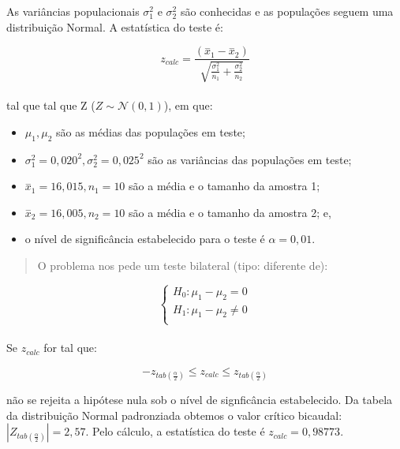 \documentclass[
]{book}
\providecommand{\tightlist}{%
  \setlength{\itemsep}{0pt}\setlength{\parskip}{0pt}}
\begin{document}
\hfill\break

As variâncias populacionais \(\sigma_{1}^{2}\) e \(\sigma_{2}^{2}\) são conhecidas e as populações seguem uma distribuição Normal. A estatística do teste é:

\hfill\break

\[
z_{calc} =   \frac{(\stackrel{-}{x}_{1} - \stackrel{-}{x}_{2}) }{\sqrt{\frac{\sigma^{2}_{1}}{n_{1}}+\frac{\sigma^{2}_{2}}{n_{2}}}}
\]\\

tal que tal que Z (\(Z \sim \mathcal{N}(0,1)\)), em que:

\hfill\break

\begin{itemize}
\tightlist
\item
  \(\mu_{1} , \mu_{2}\) são as médias das populações em teste;\\
\item
  \(\sigma_{1}^{2}=0,020^{2}, \sigma_{2}^{2}=0,025^{2}\) são as variâncias das populações em teste;\\
\item
  \(\stackrel{-}{x}_{1}=16,015, n_{1}=10\) são a média e o tamanho da amostra 1;\\
\item
  \(\stackrel{-}{x}_{2}=16,005, n_{2}=10\) são a média e o tamanho da amostra 2; e,\\
\item
  o nível de significância estabelecido para o teste é \(\alpha=0,01\).
\end{itemize}

\hfill\break

\begin{quote}
O problema nos pede um teste bilateral (tipo: diferente de):
\end{quote}

\[
\begin{cases}
    H_{0}: \mu_{1} - \mu_{2} = 0 \\
    H_{1}: \mu_{1} - \mu_{2} \ne 0 \\
\end{cases}
\]\\

Se \(z_{calc}\) for tal que:

\hfill\break

\[
-{z}_{tab\left(\frac{\alpha }{2}\right)} \le z_{calc} \le {z}_{tab\left(\frac{\alpha }{2}\right)}
\]

\hfill\break

não se rejeita a hipótese nula sob o nível de signficância estabelecido. Da tabela da distribuição Normal padronziada obtemos o valor crítico bicaudal: \(|{Z}_{tab\left(\frac{\alpha }{2}\right)}|=2,57\). Pelo cálculo, a estatística do teste é \(z_{calc}=0,98773\).
\end{document}
